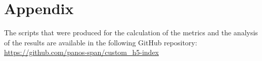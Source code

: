 \chapter{Appendix}
\label{ch:appendix}

The scripts that were produced for the calculation of the metrics and the
analysis of the results are available in the following GitHub repository:
\url{
    https://github.com/panos-span/custom_h5-index
}